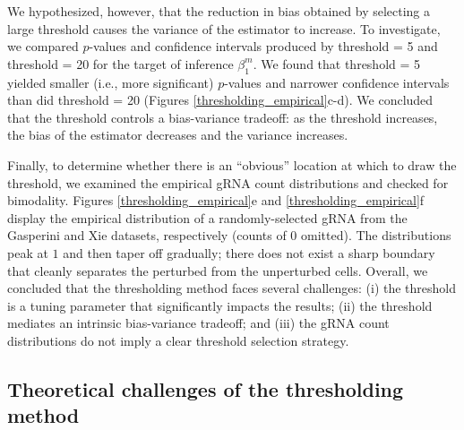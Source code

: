 \documentclass[12pt]{article}
\begin{document}
We hypothesized, however, that the reduction in bias obtained by selecting a large threshold causes the variance of the estimator to increase. To investigate, we compared $p$-values and confidence intervals produced by threshold = 5 and threshold = 20 for the target of inference $\beta^m_1$. We found that threshold = 5 yielded smaller (i.e., more significant) $p$-values and narrower confidence intervals than did threshold = 20 (Figures \ref{thresholding_empirical}c-d). We concluded that the threshold controls a bias-variance tradeoff: as the threshold increases, the bias of the estimator decreases and the variance increases.

Finally, to determine whether there is an ``obvious'' location at which to draw the threshold, we examined the empirical gRNA count distributions and checked for bimodality. Figures \ref{thresholding_empirical}e and \ref{thresholding_empirical}f display the empirical distribution of a randomly-selected gRNA from the Gasperini and Xie datasets, respectively (counts of $0$ omitted). The distributions peak at $1$ and then taper off gradually; there does not exist a sharp boundary that cleanly separates the perturbed from the unperturbed cells. Overall, we concluded that the thresholding method faces several challenges: (i) the threshold is a tuning parameter that significantly impacts the results; (ii) the threshold mediates an intrinsic bias-variance tradeoff; and (iii) the gRNA count distributions do not imply a clear threshold selection strategy.

\subsection{Theoretical challenges of the thresholding method}\label{sec:thresholding_theory}
\end{document}
